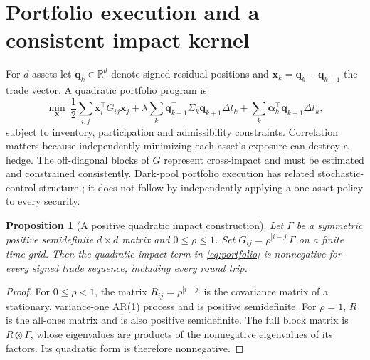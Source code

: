 \documentclass[11pt]{article}
\numberwithin{equation}{section}
\newtheorem{proposition}[theorem]{Proposition}
\theoremstyle{definition}
\theoremstyle{remark}
\newcommand{\R}{\mathbb{R}}
\theoremstyle{definition}
\begin{document}
\section{Portfolio execution and a consistent impact kernel}\label{app:portfolio}

For $d$ assets let $\bm q_k\in\R^d$ denote signed residual positions and
$\bm x_k=\bm q_k-\bm q_{k+1}$ the trade vector. A quadratic portfolio
program is
\begin{equation}\label{eq:portfolio}
 \min_{\bm x}\ \frac12\sum_{i,j}\bm x_i^\top G_{ij}\bm x_j
   +\lambda\sum_k\bm q_{k+1}^\top\Sigma_k\bm q_{k+1}\Delta t_k
   +\sum_k\bm\alpha_k^\top\bm q_{k+1}\Delta t_k,
\end{equation}
subject to inventory, participation and admissibility constraints. Correlation
matters because independently minimizing each asset's exposure can destroy a
hedge. The off-diagonal blocks of $G$ represent cross-impact and must be
estimated and constrained consistently. Dark-pool portfolio execution has
related stochastic-control structure \citep{kratz2015}; it does not follow
by independently applying a one-asset policy to every security.

\begin{proposition}[A positive quadratic impact construction]\label{prop:kron}
Let $\Gamma$ be a symmetric positive semidefinite $d\times d$ matrix and
$0\leq\rho\leq1$. Set $G_{ij}=\rho^{|i-j|}\Gamma$ on a finite time grid.
Then the quadratic impact term in \eqref{eq:portfolio} is nonnegative for
every signed trade sequence, including every round trip.
\end{proposition}
\begin{proof}
For $0\leq\rho<1$, the matrix $R_{ij}=\rho^{|i-j|}$ is the covariance matrix
of a stationary, variance-one AR(1) process and is positive semidefinite.
For $\rho=1$, $R$ is the all-ones matrix and is also positive semidefinite.
The full block matrix is $R\otimes\Gamma$, whose eigenvalues are products
of the nonnegative eigenvalues of its factors. Its quadratic form is
therefore nonnegative.
\end{proof}
\end{document}
